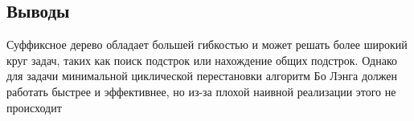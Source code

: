 \documentclass[12pt]{article}
\begin{document}
\newpage
\subsection*{Выводы}

Суффиксное дерево обладает большей гибкостью и может решать более широкий круг задач, таких как поиск подстрок или нахождение общих подстрок. Однако для задачи минимальной циклической перестановки алгоритм Бо Лэнга должен работать быстрее и эффективнее, но из-за плохой наивной реализации этого не происходит
\end{document}
